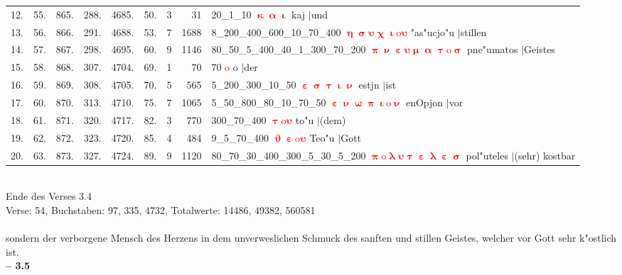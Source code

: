 \documentclass[a4paper,10pt,landscape]{article}
\begin{document}
\begin{tabular}{rrrrrrrrp{120mm}}
12.&55.&865.&288.&4685.&50.&3&31&20\_1\_10 \textcolor{red}{$\boldsymbol{\upkappa\upalpha\upiota}$} kaj $|$und\\
13.&56.&866.&291.&4688.&53.&7&1688&8\_200\_400\_600\_10\_70\_400 \textcolor{red}{$\boldsymbol{\upeta\upsigma\upsilon\upchi\upiota\mathrm{o}\upsilon}$} "as"ucjo"u $|$stillen\\
14.&57.&867.&298.&4695.&60.&9&1146&80\_50\_5\_400\_40\_1\_300\_70\_200 \textcolor{red}{$\boldsymbol{\uppi\upnu\upepsilon\upsilon\upmu\upalpha\uptau\mathrm{o}\upsigma}$} pne"umatos $|$Geistes\\
15.&58.&868.&307.&4704.&69.&1&70&70 \textcolor{red}{$\boldsymbol{\mathrm{o}}$} o $|$der\\
16.&59.&869.&308.&4705.&70.&5&565&5\_200\_300\_10\_50 \textcolor{red}{$\boldsymbol{\upepsilon\upsigma\uptau\upiota\upnu}$} estjn $|$ist\\
17.&60.&870.&313.&4710.&75.&7&1065&5\_50\_800\_80\_10\_70\_50 \textcolor{red}{$\boldsymbol{\upepsilon\upnu\upomega\uppi\upiota\mathrm{o}\upnu}$} enOpjon $|$vor\\
18.&61.&871.&320.&4717.&82.&3&770&300\_70\_400 \textcolor{red}{$\boldsymbol{\uptau\mathrm{o}\upsilon}$} to"u $|$(dem)\\
19.&62.&872.&323.&4720.&85.&4&484&9\_5\_70\_400 \textcolor{red}{$\boldsymbol{\upvartheta\upepsilon\mathrm{o}\upsilon}$} Teo"u $|$Gott\\
20.&63.&873.&327.&4724.&89.&9&1120&80\_70\_30\_400\_300\_5\_30\_5\_200 \textcolor{red}{$\boldsymbol{\uppi\mathrm{o}\uplambda\upsilon\uptau\upepsilon\uplambda\upepsilon\upsigma}$} pol"uteles $|$(sehr) kostbar\\
\end{tabular}\medskip \\
Ende des Verses 3.4\\
Verse: 54, Buchstaben: 97, 335, 4732, Totalwerte: 14486, 49382, 560581\\
\\
sondern der verborgene Mensch des Herzens in dem unverweslichen Schmuck des sanften und stillen Geistes, welcher vor Gott sehr k"ostlich ist.\\
\newpage 
{\bf -- 3.5}\\
\medskip \\
\end{document}
